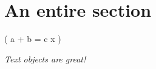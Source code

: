 \section{An entire section}       %

\left( a + b = c \diff x \right)  %

\textit{Text objects are great!}  %

